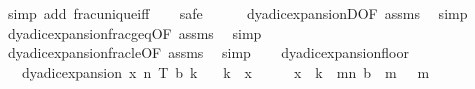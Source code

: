 \begin{isabellebody}
\endisadelimproof
%
\isatagproof
{}\isamarkupfalse%
\ {\isacharparenleft}{\kern0pt}simp\ add{\isacharcolon}{\kern0pt}\ frac{\isacharunderscore}{\kern0pt}unique{\isacharunderscore}{\kern0pt}iff{\isacharparenright}{\kern0pt}\isanewline
\ \ \isamarkupfalse%
\ safe\isanewline
\ \ \ \ \isamarkupfalse%
\ dyadic{\isacharunderscore}{\kern0pt}expansionD{\isacharparenleft}{\kern0pt}{}{\isacharparenright}{\kern0pt}{\isacharbrackleft}{\kern0pt}OF\ assms{\isacharbrackright}{\kern0pt}\ \isamarkupfalse%
\ simp\isanewline
\ \ \ \ \isamarkupfalse%
\ dyadic{\isacharunderscore}{\kern0pt}expansion{\isacharunderscore}{\kern0pt}frac{\isacharunderscore}{\kern0pt}geq{\isacharunderscore}{\kern0pt}{}{\isacharbrackleft}{\kern0pt}OF\ assms{\isacharbrackright}{\kern0pt}\ \isamarkupfalse%
\ simp\isanewline
\ \ \ \ \isamarkupfalse%
\ dyadic{\isacharunderscore}{\kern0pt}expansion{\isacharunderscore}{\kern0pt}frac{\isacharunderscore}{\kern0pt}le{\isacharunderscore}{\kern0pt}{}{\isacharbrackleft}{\kern0pt}OF\ assms{\isacharbrackright}{\kern0pt}\ \isamarkupfalse%
\ simp\isanewline
\ \ \isamarkupfalse%
%
\endisatagproof
{\isafoldproof}%
%
\isadelimproof
\isanewline
%
\endisadelimproof
\isanewline
{}\isamarkupfalse%
\ dyadic{\isacharunderscore}{\kern0pt}expansion{\isacharunderscore}{\kern0pt}floor{\isacharcolon}{\kern0pt}\isanewline
\ \ \ {\isachardoublequoteopen}dyadic{\isacharunderscore}{\kern0pt}expansion\ x\ n\ T\ b\ k{\isachardoublequoteclose}\isanewline
\ \ \ {\isachardoublequoteopen}k\ {\isacharequal}{\kern0pt}\ {\isasymlfloor}x{\isasymrfloor}{\isachardoublequoteclose}\isanewline
%
\isadelimproof
%
\endisadelimproof
%
\isatagproof
{}\isamarkupfalse%
\ {\isacharminus}{\kern0pt}\isanewline
\ \ \isamarkupfalse%
\ {\isachardoublequoteopen}x\ {\isacharequal}{\kern0pt}\ k\ {\isacharplus}{\kern0pt}\ {\isacharparenleft}{\kern0pt}{\isasymSum}m{\isasymin}{\isacharbraceleft}{\kern0pt}{}{\isachardot}{\kern0pt}{\isachardot}{\kern0pt}n{\isacharbraceright}{\kern0pt}{\isachardot}{\kern0pt}\ {\isacharparenleft}{\kern0pt}b\ {\isacharbang}{\kern0pt}\ {\isacharparenleft}{\kern0pt}m{\isacharminus}{\kern0pt}{}{\isacharparenright}{\kern0pt}{\isacharparenright}{\kern0pt}{\isacharslash}{\kern0pt}\ {}\ {\isacharcircum}{\kern0pt}\ m{\isacharparenright}{\kern0pt}{\isachardoublequoteclose}\isanewline

\end{isabellebody}
